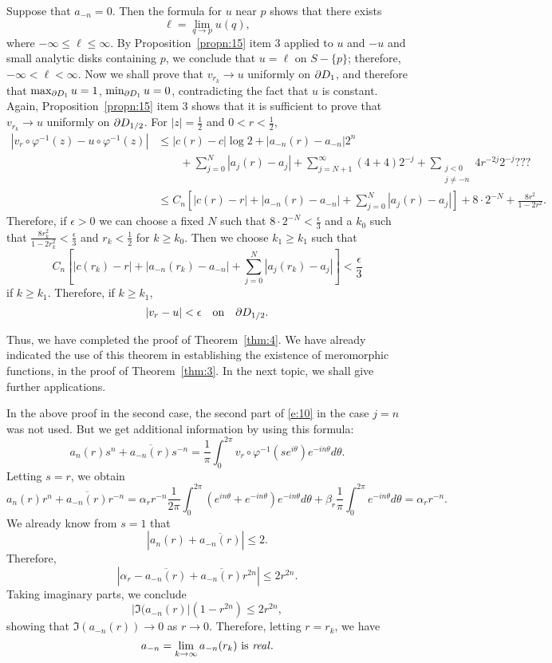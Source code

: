 \documentclass[a4paper,11pt]{article}
\newcounter{topic}
\begin{document}
Suppose that $a_{-n} = 0$.  Then the formula for $u$ near $p$ shows
that there exists
$$
\ell = \lim_{q\to p} u(q),
$$
where $-\infty \le \ell \le \infty$.  By Proposition~\ref{propn:15}
item 3 applied to $u$ and $-u$ and small analytic disks containing
$p$, we conclude that $u = \ell$ on $S - \{p\}$; therefore, $-\infty <
\ell < \infty$.  Now we shall prove that $v_{r_k} \to u$ uniformly on
$\partial D_1$, and therefore that $\max_{\partial D_1} u = 1$, $\min_{\partial D_1} u =
0$, contradicting the fact that $u$ is constant.  Again,
Proposition~\ref{propn:15} item 3 shows that it is sufficient to prove
that $v_{r_k} \to u$ uniformly on $\partial D_{1/2}$.  For $|z| =
\frac{1}{2}$ and $0 < r < \frac{1}{2}$,
$$
\begin{aligned}
  |v_r \circ \varphi^{-1}(z) - u \circ \varphi^{-1}(z)|
  &\le |c(r) - c| \log 2 + |a_{-n}(r) - a_{-n}| 2^n\\
  &\qquad + \sum_{j=0}^{N} |a_j(r) - a_j| 
  + \sum_{j=N+1}^{\infty} (4 + 4) 2^{-j} 
  + \sum_{\substack{j<0\\j\ne -n}} 4r^{-2j} 2^{-j} ???\\
  &\le C_n\left[
    |c(r) - r| + |a_{-n}(r) - a_{-n}| 
    + \sum_{j=0}^{N} |a_j(r) - a_j|
  \right] + 8\cdot 2^{-N} + \frac{8r^2}{1-2r^2}.
\end{aligned}
$$
Therefore, if $\epsilon > 0$ we can choose a fixed $N$ such that $8
\cdot 2^{-N} < \frac{\epsilon}{3}$ and a $k_0$ such that
$\frac{8r_k^2}{1-2r_k^2} < \frac{\epsilon}{3}$ and $r_k < \frac{1}{2}$
for $k \ge k_0$.  Then we choose $k_1 \ge k_1$ such that
$$
C_n\left[
  |c(r_k) - r| + |a_{-n}(r_k) - a_{-n}| 
  + \sum_{j=0}^{N} |a_j(r_k) - a_j|
\right] < \frac{\epsilon}{3}
$$
if $k \ge k_1$.  Therefore, if $k \ge k_1$, 
$$
|v_r - u| < \epsilon \quad\text{on}\quad \partial D_{1/2}.
$$

Thus, we have completed the proof of Theorem~\ref{thm:4}.  We have
already indicated the use of this theorem in establishing the
existence of meromorphic functions, in the proof of
Theorem~\ref{thm:3}.  In the next topic, we shall give further
applications.

\begin{rem}
  In the above proof in the second case, the second part of
  \eqref{e:10} in the case $j=n$ was not used.  But we get additional
  information by using this formula:
  $$
  a_n(r) s^n + \overline{a_{-n}(r)} s^{-n}
  = \frac{1}{\pi} \int_0^{2\pi} v_r \circ \varphi^{-1}(s e^{i\theta})
  e^{-in\theta} d\theta.
  $$
  Letting $s = r$, we obtain
  $$
  a_n(r) r^n + \overline{a_{-n}(r)} r^{-n}
  = \alpha_r r^{-n} \frac{1}{2\pi} \int_0^{2\pi} (e^{in\theta} 
  + e^{-in\theta}) e^{-in\theta} d\theta 
  + \beta_r \frac{1}{\pi} \int_0^{2\pi} e^{-in\theta} d \theta
  = \alpha_r r^{-n}.
  $$
  We already know from $s = 1$ that
  $$
  |a_n(r) + \overline{a_{-n}(r)}| \le 2.
  $$
  Therefore,
  $$
  |\alpha_r - \overline{a_{-n}(r)} 
  + \overline{a_{-n}(r)}r^{2n}| \le 2r^{2n}.
  $$
  Taking imaginary parts, we conclude
  $$
  |\Im(a_{-n}(r)| (1 - r^{2n}) \le 2r^{2n},
  $$
  showing that $\Im(a_{-n}(r)) \to 0$ as $r \to 0$.  Therefore, letting
  $r = r_k$, we have
  $$
  a_{-n} = \lim_{k\to \infty} a_{-n}(r_k) \text{ is \emph{real}}.
  $$
\end{rem}
\end{document}
